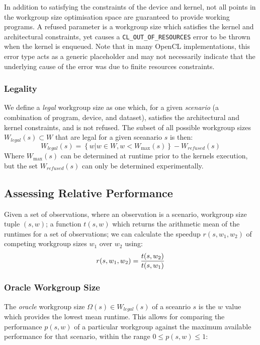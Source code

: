 In addition to satisfying the constraints of the device and kernel,
not all points in the workgroup size optimisation space are guaranteed
to provide working programs. A refused parameter is a workgroup size
which satisfies the kernel and architectural constraints, yet causes a
\texttt{CL\_OUT\_OF\_RESOURCES} error to be thrown when the kernel is
enqueued. Note that in many OpenCL implementations, this error type
acts as a generic placeholder and may not necessarily indicate that
the underlying cause of the error was due to finite resources
constraints.


\subsubsection{Legality}

We define a \emph{legal} workgroup size as one which, for a given
\emph{scenario} (a combination of program, device, and dataset),
satisfies the architectural and kernel constraints, and is not
refused. The subset of all possible workgroup sizes
$W_{legal}(s) \subset W$ that are legal for a given sceanario $s$ is
then:
%
\begin{equation}
  W_{legal}(s) = \left\{w | w \in W, w < W_{\max}(s) \right\} - W_{refused}(s)
\end{equation}
%
Where $W_{\max}(s)$ can be determined at runtime prior to the kernels
execution, but the set $W_{refused}(s)$ can only be determined
experimentally.


\subsection{Assessing Relative Performance}

Given a set of observations, where an observation is a scenario,
workgroup size tuple $(s,w)$; a function $t(s,w)$ which returns the
arithmetic mean of the runtimes for a set of observations; we can
calculate the speedup $r(s, w_1, w_2)$ of competing workgroup sizes
$w_1$ over $w_2$ using:
%
\begin{equation}
  r(s, w_1, w_2) = \frac{t(s,w_2)}{t(s,w_1)}\\
\end{equation}
%

\subsubsection{Oracle Workgroup Size}

The \emph{oracle} workgroup size $\Omega(s) \in W_{legal}(s)$ of a
sceanrio $s$ is the $w$ value which provides the lowest mean
runtime. This allows for comparing the performance $p(s,w)$ of a
particular workgroup against the maximum available performance for
that scenario, within the range $0 \le p(s,w) \le 1$:

